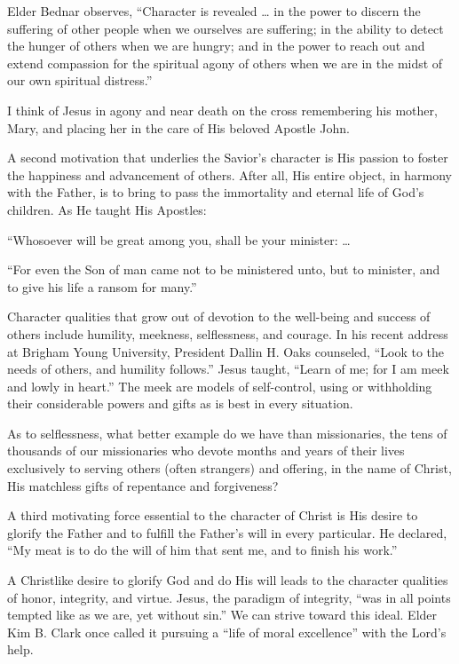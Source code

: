 \documentclass[letterpaper, 11pt]{report}
\begin{document}
Elder Bednar observes, “Character is revealed … in the power to discern the suffering of other people when we ourselves are suffering; in the ability to detect the hunger of others when we are hungry; and in the power to reach out and extend compassion for the spiritual agony of others when we are in the midst of our own spiritual distress.”

I think of Jesus in agony and near death on the cross remembering his mother, Mary, and placing her in the care of His beloved Apostle John.

A second motivation that underlies the Savior’s character is His passion to foster the happiness and advancement of others. After all, His entire object, in harmony with the Father, is to bring to pass the immortality and eternal life of God’s children. As He taught His Apostles:

“Whosoever will be great among you, shall be your minister: …

“For even the Son of man came not to be ministered unto, but to minister, and to give his life a ransom for many.”

Character qualities that grow out of devotion to the well-being and success of others include humility, meekness, selflessness, and courage. In his recent address at Brigham Young University, President Dallin H. Oaks counseled, “Look to the needs of others, and humility follows.” Jesus taught, “Learn of me; for I am meek and lowly in heart.” The meek are models of self-control, using or withholding their considerable powers and gifts as is best in every situation.

As to selflessness, what better example do we have than missionaries, the tens of thousands of our missionaries who devote months and years of their lives exclusively to serving others (often strangers) and offering, in the name of Christ, His matchless gifts of repentance and forgiveness?

A third motivating force essential to the character of Christ is His desire to glorify the Father and to fulfill the Father’s will in every particular. He declared, “My meat is to do the will of him that sent me, and to finish his work.”

A Christlike desire to glorify God and do His will leads to the character qualities of honor, integrity, and virtue. Jesus, the paradigm of integrity, “was in all points tempted like as we are, yet without sin.” We can strive toward this ideal. Elder Kim B. Clark once called it pursuing a “life of moral excellence” with the Lord’s help.
\end{document}
